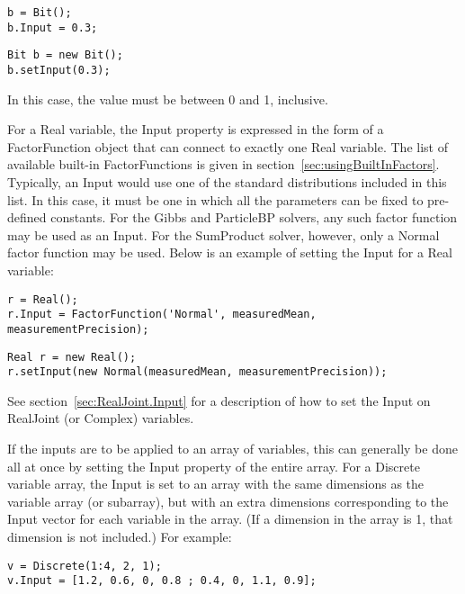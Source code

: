 \begin{lstlisting}
b = Bit();
b.Input = 0.3;
\end{lstlisting}

\fi

\ifjava
\begin{lstlisting}
Bit b = new Bit();
b.setInput(0.3);
\end{lstlisting}
\fi

In this case, the value must be between 0 and 1, inclusive.

For a Real variable, the Input property is expressed in the form of a FactorFunction object that can connect to exactly one Real variable.  The list of available built-in FactorFunctions is given in section~\ref{sec:usingBuiltInFactors}.  Typically, an Input would use one of the standard distributions included in this list.  In this case, it must be one in which all the parameters can be fixed to pre-defined constants.  For the Gibbs and ParticleBP solvers, any such factor function may be used as an Input.  For the SumProduct solver, however, only a Normal factor function may be used.  Below is an example of setting the Input for a Real variable:

\ifmatlab

\begin{lstlisting}
r = Real();
r.Input = FactorFunction('Normal', measuredMean, measurementPrecision);
\end{lstlisting}

\fi

\ifjava

\begin{lstlisting}
Real r = new Real();
r.setInput(new Normal(measuredMean, measurementPrecision));
\end{lstlisting}

\fi

See section~\ref{sec:RealJoint.Input} for a description of how to set the Input on RealJoint (or Complex) variables.

\ifmatlab

If the inputs are to be applied to an array of variables, this can generally be done all at once by setting the Input property of the entire array.  For a Discrete variable array, the Input is set to an array with the same dimensions as the variable array (or subarray), but with an extra dimensions corresponding to the Input vector for each variable in the array.  (If a dimension in the array is 1, that dimension is not included.) For example:

\begin{lstlisting}
v = Discrete(1:4, 2, 1);
v.Input = [1.2, 0.6, 0, 0.8 ; 0.4, 0, 1.1, 0.9];
\end{lstlisting}

